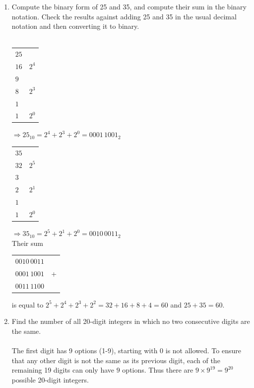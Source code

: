 \documentclass[10pt,a4paper,final]{article}
\begin{document}
\begin{enumerate}
\item %
Compute the binary form of 25 and 35, and compute
their sum in the binary notation. Check the results
against adding 25 and 35 in the usual decimal notation
and then converting it to binary.\\
\\
\begin{tabular}{l | l}
\cline{1-1}
$25$\\
$16$ & $2^4$\\
\cline{1-1}
$9$\\
$8$ & $2^3$\\
\cline{1-1}
$1$\\
$1$ & $2^0$\\
\end{tabular}
$\Rightarrow 25_{10} = 2^4 + 2^3 + 2^0 = 0001\,1001_2\qquad$
\begin{tabular}{l | l}
\cline{1-1}
$35$\\
$32$ & $2^5$\\
\cline{1-1}
$3$\\
$2$ & $2^1$\\
\cline{1-1}
$1$\\
$1$ & $2^0$\\
\end{tabular}
$\Rightarrow 35_{10} = 2^5 + 2^1 + 2^0 = 0010\,0011_2$\\
Their sum
\begin{tabular}{c l}
$0010\,0011$\\
$0001\,1001$ & +\\
\hline
$0011\,1100$
\end{tabular}
is equal to $2^5 + 2^4 + 2^3 + 2^2 = 32 + 16 + 8 + 4 = 60$
and $25 + 35 = 60$.

\item %
Find the number of all 20-digit integers in which no two consecutive digits are the same.\\
\\
The first digit has 9 options (1-9), starting with 0 is not allowed.
To ensure that any other digit is not the same as its previous digit,
each of the remaining 19 digits can only have $9$ options.
Thus there are $9 \times 9^{19} = 9^{20}$ possible 20-digit integers.


\end{enumerate}
\end{document}
